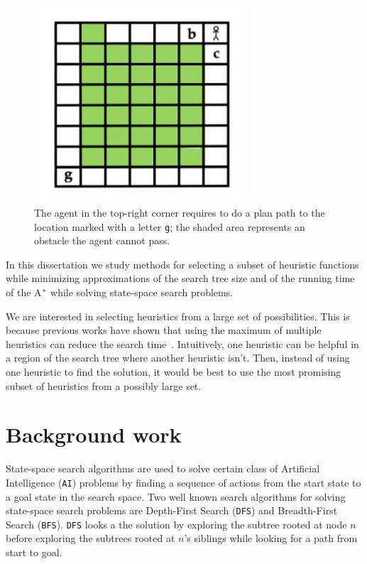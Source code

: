 \begin{figure}[h]
\centering
\includegraphics[width=8cm]{images/editarExampleLevi-Green}
\caption{The agent in the top-right corner requires to do a plan path to the location marked with a letter \texttt{g}; the shaded area represents an obstacle the agent cannot pass.} \label{fig:example_fix}
\end{figure}
\fi

In this dissertation we study methods for selecting a subset of heuristic functions while minimizing approximations of the search tree size and of the running time of the A$\sp{*}$ \cite{hart1968formal} while solving state-space search problems.

We are interested in selecting heuristics from a large set of possibilities. This is because previous works have shown that using the maximum of multiple heuristics can reduce the search time~\cite{holte2006maximizing}. Intuitively, one heuristic can be helpful in a region of the search tree where another heuristic isn't. Then, instead of using one heuristic to find the solution, it would be best to use the most promising subset of heuristics from a possibly large set.

\section{Background work}
\noindent
State-space search algorithms are used to solve certain class of Artificial Intelligence (\texttt{AI}) problems by finding a sequence of actions from the start state to a goal state in the search space. Two well known search algorithms for solving state-space search problems are Depth-First Search (\texttt{DFS}) and Breadth-First Search (\texttt{BFS}). \texttt{DFS} looks a the solution by exploring the subtree rooted at node $n$ before exploring the subtrees rooted at $n$'s siblings while looking for a path from start to goal. 

